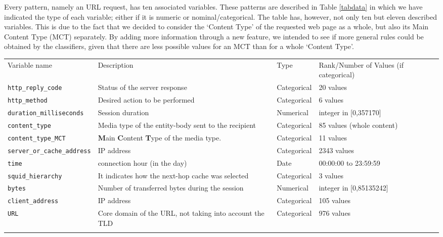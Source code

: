 \documentclass{llncs}
\begin{document}
Every pattern, namely an URL request, has ten associated variables. These patterns are described in Table \ref{tabdata} in which we have indicated the type of  each variable; either if it is numeric or nominal/categorical. The table has, however, not only ten but eleven described variables. This is due to the fact that we decided to consider the `Content Type' of the requested web page as a whole, but also its Main Content Type (MCT) separately. By adding more information through a new feature, we intended to see if more general rules could be obtained by the classifiers, given that there are less possible values for an MCT than for a whole `Content Type'.

 

\begin{table*}[htpb]
\centering
 \caption{\label{tabdata} Independent Variables corresponding to a URL
   request through \textit{HTTP}. The URLs are parsed as detailed in
   Subsection \ref{sec:buldingdataset}.} 
   
{\scriptsize
\begin{tabular}{llll}
\hline\noalign{\smallskip}
Variable name & Description & Type & Rank/Number of Values (if categorical)\\
\noalign{\smallskip}\hline\noalign{\smallskip}
\texttt{http\_reply\_code} & Status of the server response & Categorical & 20 values\\
\texttt{http\_method} & Desired action to be performed & Categorical & 6 values\\
\texttt{duration\_milliseconds} & Session duration & Numerical & integer in [0,357170]\\
\texttt{content\_type} & Media type of the entity-body sent to the recipient & Categorical & 85 values (whole content)\\
\texttt{content\_type\_MCT} & \textbf{M}ain \textbf{C}ontent \textbf{T}ype of the media type. & Categorical & 11 values\\
\texttt{server\_or\_cache\_address} & IP address & Categorical & 2343 values\\
\texttt{time} & connection hour (in the day) & Date & 00:00:00 to 23:59:59\\
\texttt{squid\_hierarchy} & It indicates how the next-hop cache was selected & Categorical & 3 values\\
\texttt{bytes} & Number of transferred bytes during the session & Numerical & integer in [0,85135242]\\
\texttt{client\_address} & IP address & Categorical & 105 values\\
\texttt{URL} & Core domain of the URL, not taking into account the TLD & Categorical & 976 values\\
\noalign{\smallskip}\hline
\end{tabular}
}
\end{table*}
\end{document}

